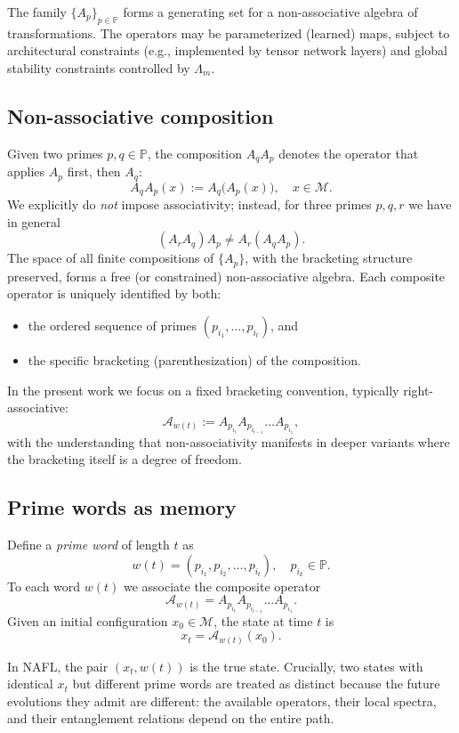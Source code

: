 \documentclass[11pt]{article}
\newcommand{\Mcal}{\mathcal{M}}
\newcommand{\Acal}{\mathcal{A}}
\newcommand{\Lm}{\Lambda_m}
\begin{document}
The family \(\{A_p\}_{p \in \mathbb{P}}\) forms a generating set for a non-associative algebra of transformations.
The operators may be parameterized (learned) maps, subject to architectural constraints (e.g., implemented by tensor network layers) and global stability constraints controlled by \(\Lm\).

\subsection{Non-associative composition}

Given two primes \(p,q \in \mathbb{P}\), the composition \(A_q A_p\) denotes the operator that applies \(A_p\) first, then \(A_q\):
\[
A_q A_p(x) := A_q\big( A_p(x) \big), \quad x \in \Mcal.
\]
We explicitly do \emph{not} impose associativity; instead, for three primes \(p,q,r\) we have in general
\[
(A_r A_q) A_p \neq A_r (A_q A_p).
\]
The space of all finite compositions of \(\{A_p\}\), with the bracketing structure preserved, forms a free (or constrained) non-associative algebra.
Each composite operator is uniquely identified by both:
\begin{itemize}[nosep]
    \item the ordered sequence of primes \((p_{i_1}, \dots, p_{i_t})\), and
    \item the specific bracketing (parenthesization) of the composition.
\end{itemize}

In the present work we focus on a fixed bracketing convention, typically right-associative:
\[
\Acal_{w(t)} := A_{p_{i_t}} A_{p_{i_{t-1}}} \dots A_{p_{i_1}},
\]
with the understanding that non-associativity manifests in deeper variants where the bracketing itself is a degree of freedom.

\subsection{Prime words as memory}

Define a \emph{prime word} of length \(t\) as
\[
w(t) = (p_{i_1}, p_{i_2}, \dots, p_{i_t}), \quad p_{i_k} \in \mathbb{P}.
\]
To each word \(w(t)\) we associate the composite operator
\[
\Acal_{w(t)} = A_{p_{i_t}} A_{p_{i_{t-1}}} \dots A_{p_{i_1}}.
\]
Given an initial configuration \(x_0 \in \Mcal\), the state at time \(t\) is
\[
x_t = \Acal_{w(t)}(x_0).
\]

In NAFL, the pair \((x_t, w(t))\) is the true state.
Crucially, two states with identical \(x_t\) but different prime words are treated as distinct because the future evolutions they admit are different: the available operators, their local spectra, and their entanglement relations depend on the entire path.
\end{document}
